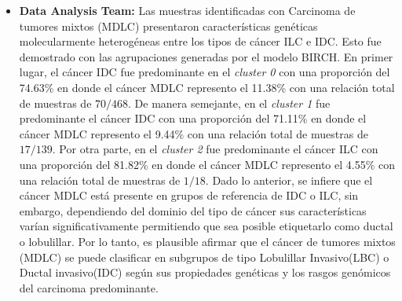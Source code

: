 \clearpage
{}
\begin{itemize}[label=\PencilRightDown]
	
	\item \textbf{Data Analysis Team:} Las muestras identificadas con Carcinoma de tumores mixtos (MDLC) presentaron características genéticas molecularmente heterogéneas entre los tipos de cáncer ILC e IDC. Esto fue demostrado con las agrupaciones generadas por el modelo BIRCH. En primer lugar, el cáncer IDC fue predominante en el \textit{cluster 0} con una proporción del 74.63\% en donde el cáncer MDLC represento el 11.38\% con una relación total de muestras de $70/468$. De manera semejante, en el \textit{cluster 1} fue predominante el cáncer IDC con una proporción del 71.11\% en donde el cáncer MDLC represento el 9.44\% con una relación total de muestras de $17/139$. Por otra parte, en el \textit{cluster 2} fue predominante el cáncer ILC con una proporción del 81.82\% en donde el cáncer MDLC represento el 4.55\% con una relación total de muestras de $1/18$. Dado lo anterior, se infiere que el cáncer MDLC está presente en grupos de referencia de IDC o ILC, sin embargo, dependiendo del dominio del tipo de cáncer sus características varían significativamente permitiendo que sea posible etiquetarlo como ductal o lobulillar. Por lo tanto, es plausible afirmar que el cáncer de tumores mixtos (MDLC) se puede clasificar en subgrupos de tipo Lobulillar Invasivo(LBC) o Ductal invasivo(IDC) según sus propiedades genéticas y los rasgos genómicos del carcinoma predominante.
	

\end{itemize}
